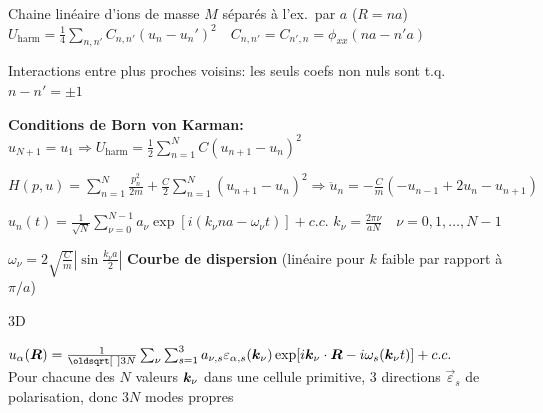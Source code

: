 \begin{squishlist}
    \item Chaine linéaire d'ions de masse $M$ séparés à l'ex.\ par $a$ ($R = na$)\\
    $U_{\text{harm}} = \frac{1}{4} \sum_{n,n'} C_{n,n'}(u_n - u_n')^2 \quad C_{n,n'} = C_{n',n} = \phi_{xx}(na - n'a)$
    \item Interactions entre plus proches voisins: les seuls coefs non nuls sont t.q.\ $n-n'= \pm 1$
    \item \textbf{Conditions de Born von Karman:} $u_{N+1} = u_1 \Longrightarrow U_{\text{harm}} = \frac{1}{2}\sum_{n=1}^{N}C(u_{n+1}-u_n)^2$
    \item $H(p,u) = \sum_{n=1}^{N}\frac{p^2_n}{2m} + \frac{C}{2}\sum_{n=1}^{N}(u_{n+1} - u_n)^2 \Longrightarrow \ddot{u}_n = -\frac{C}{m}(-u_{n-1}+2u_n - u_{n+1})$
    \item $u_n(t) = \frac{1}{\sqrt{N}} \sum_{\nu=0}^{N-1}a_{\nu} \exp[ i (k_{\nu}na - \omega_{\nu}t)] + c.c.$ \quad $k_{\nu} = \frac{2\pi \nu}{aN} \quad \nu = 0,1,\ldots, N-1$
    \item $\omega_{\nu} = 2 \sqrt{\frac{C}{m}} \left| \sin \frac{k_{\nu}a}{2}\right|$ \textbf{Courbe de dispersion} (linéaire pour $k$ faible par rapport à $\pi/a$)

    \squishline

    3D
    \item $u_{\alpha}(\vR) = \frac{1}{\sqrt{3N}}\sum_{\nu}\sum_{s=1}^{3} a_{\nu,s} \varepsilon_{\alpha,s}(\vk_{\nu}) \exp [i \vk_{\nu} \cdot \vR - i \omega_s(\vk_{\nu}t)] + c.c.$ \\ 
    Pour chacune des $N$ valeurs $\bm{k}_{\nu}$ dans une cellule primitive, 3 directions $\vec{\varepsilon}_s$ de polarisation, donc $3N$ modes propres
\end{squishlist}


